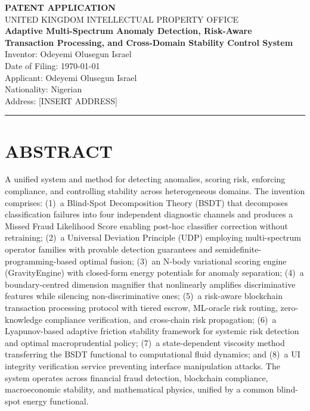 \documentclass[12pt,a4paper]{article}
\begin{document}
\begin{center}
{\Large\bfseries PATENT APPLICATION}\\[0.5em]
{\large UNITED KINGDOM INTELLECTUAL PROPERTY OFFICE}\\[1.5em]
{\Large\bfseries Adaptive Multi-Spectrum Anomaly Detection, Risk-Aware\\
Transaction Processing, and Cross-Domain Stability Control System}\\[1.5em]
{\large Inventor: Odeyemi Olusegun Israel}\\[0.5em]
{\large Date of Filing: \today}\\[0.5em]
{\large Applicant: Odeyemi Olusegun Israel}\\[0.3em]
{\large Nationality: Nigerian}\\[0.3em]
{\large Address: [INSERT ADDRESS]}
\end{center}

\vspace{1em}
\hrule
\vspace{1em}

\section*{ABSTRACT}

A unified system and method for detecting anomalies, scoring risk, enforcing
compliance, and controlling stability across heterogeneous domains.  The
invention comprises: (1)~a Blind-Spot Decomposition Theory (BSDT) that
decomposes classification failures into four independent diagnostic channels and
produces a Missed Fraud Likelihood Score enabling post-hoc classifier correction
without retraining; (2)~a Universal Deviation Principle (UDP) employing
multi-spectrum operator families with provable detection guarantees and
semidefinite-programming-based optimal fusion; (3)~an N-body variational scoring
engine (GravityEngine) with closed-form energy potentials for anomaly
separation; (4)~a boundary-centred dimension magnifier that nonlinearly
amplifies discriminative features while silencing non-discriminative ones;
(5)~a risk-aware blockchain transaction processing protocol with tiered escrow,
ML-oracle risk routing, zero-knowledge compliance verification, and cross-chain
risk propagation; (6)~a Lyapunov-based adaptive friction stability framework
for systemic risk detection and optimal macroprudential policy; (7)~a
state-dependent viscosity method transferring the BSDT functional to
computational fluid dynamics; and (8)~a UI integrity verification service
preventing interface manipulation attacks.  The system operates across financial
fraud detection, blockchain compliance, macroeconomic stability, and
mathematical physics, unified by a common blind-spot energy functional.
\end{document}
